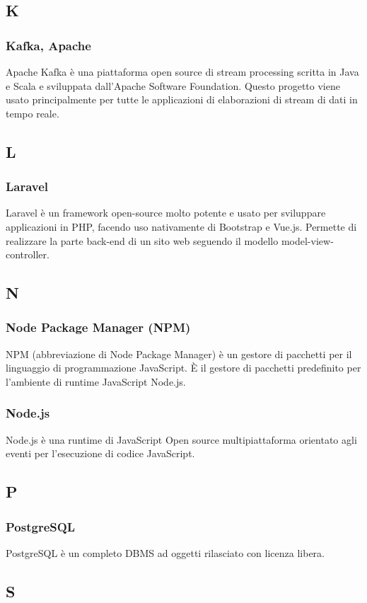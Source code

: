 \subsection{K}
\subsubsection*{Kafka, Apache}  Apache Kafka è una piattaforma open source di stream processing scritta in Java e Scala e sviluppata dall'Apache Software Foundation.  Questo progetto viene usato principalmente per tutte le applicazioni di elaborazioni di stream di dati in tempo reale.
\subsection{L}
\subsubsection*{Laravel}  Laravel è un framework open-source molto potente e usato per sviluppare applicazioni in PHP, facendo uso nativamente di Bootstrap e Vue.js. Permette di realizzare la parte back-end di un sito web seguendo il modello model-view-controller. 
\subsection{N}
\subsubsection*{Node Package Manager (NPM)}  NPM (abbreviazione di Node Package Manager) è un gestore di pacchetti per il linguaggio di programmazione JavaScript. È il gestore di pacchetti predefinito per l'ambiente di runtime JavaScript Node.js.
\subsubsection*{Node.js}  Node.js è una runtime di JavaScript Open source multipiattaforma orientato agli eventi per l'esecuzione di codice JavaScript.
\subsection{P}
\subsubsection*{PostgreSQL}  PostgreSQL è un completo DBMS ad oggetti rilasciato con licenza libera.
\subsection{S}
